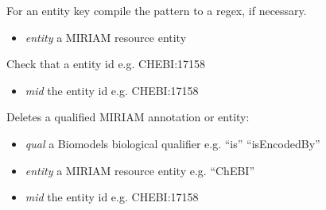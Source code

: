 \documentclass[a4paper,11pt,english]{sphinxmanual}
\begin{document}
\begin{fulllineitems}
\begin{fulllineitems}
\begin{itemize}
\end{itemize}

\end{fulllineitems}


\begin{fulllineitems}
\label{modules_doc:cbmpy.CBDataStruct.MIRIAMannotation.checkEntityPattern}
For an entity key compile the pattern to a regex, if necessary.
\begin{itemize}
\item {} 
\emph{entity} a MIRIAM resource entity

\end{itemize}

\end{fulllineitems}


\begin{fulllineitems}
\label{modules_doc:cbmpy.CBDataStruct.MIRIAMannotation.checkId}
Check that a entity id e.g. CHEBI:17158
\begin{itemize}
\item {} 
\emph{mid} the entity id e.g. CHEBI:17158

\end{itemize}

\end{fulllineitems}


\begin{fulllineitems}
\label{modules_doc:cbmpy.CBDataStruct.MIRIAMannotation.deleteMIRIAMannotation}
Deletes a qualified MIRIAM annotation or entity:
\begin{itemize}
\item {} 
\emph{qual} a Biomodels biological qualifier e.g. ``is'' ``isEncodedBy''

\item {} 
\emph{entity} a MIRIAM resource entity e.g. ``ChEBI''

\item {} 
\emph{mid} the entity id e.g. CHEBI:17158


\end{itemize}
\end{fulllineitems}
\end{fulllineitems}
\end{document}
